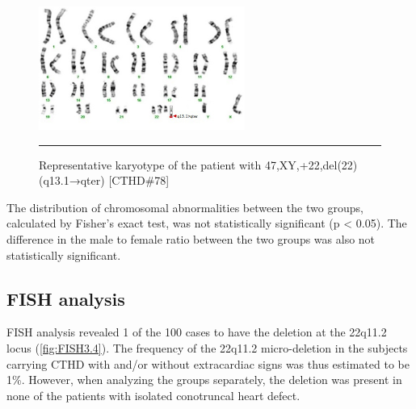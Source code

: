 \begin{refsection}
\begin{figure}[!thbp]
\centering
\includegraphics[width=\linewidth]{Figures/Figure3_3.pdf}
\rule{35em}{0.5pt}
\caption[Representative karyotype (CTHD\#78)]{Representative karyotype of the patient with 47,XY,+22,del(22)(q13.1→qter) [CTHD\#78]}
\label{fig:KT3.3}
\end{figure}

The distribution of chromosomal abnormalities between the two groups, calculated by Fisher’s exact test, was not statistically significant (p < 0.05). The difference in the male to female ratio between the two groups was also not statistically significant.

\subsection*{FISH analysis}
FISH analysis revealed 1 of the 100 cases to have the deletion at the 22q11.2 locus (\cref{fig:FISH3.4}). The frequency of the 22q11.2 micro-deletion in the subjects carrying CTHD with and/or without extracardiac signs was thus estimated to be 1\%. However, when analyzing the groups separately, the deletion was present in none of the patients with isolated conotruncal heart defect. 


\end{refsection}
